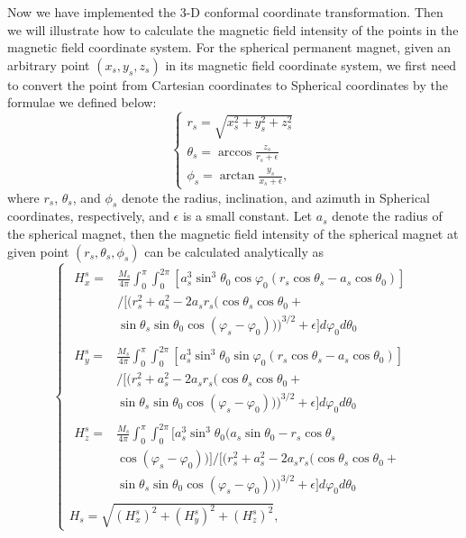 \documentclass[journal]{IEEEtran}
\begin{document}
Now we have implemented the 3-D conformal coordinate transformation. Then we will illustrate how to calculate the magnetic field intensity of the points in the magnetic field coordinate system. For the spherical permanent magnet, given an arbitrary point $(x_s, y_s, z_s)$ in its magnetic field coordinate system, we first need to convert the point from Cartesian coordinates to Spherical coordinates by the formulae we defined below:
\begin{equation}
    \left\{\begin{array}{lr}
    r_s = \sqrt{x_s^2 + y_s^2 + z_s^2} \\
    \theta_s = \arccos \frac{z_s}{r_s + \epsilon} \\
    \phi_s = \arctan \frac{y_s}{x_s + \epsilon},
    \end{array}\right.
\end{equation}
where $r_s$, $\theta_s$, and $\phi_s$ denote the radius, inclination, and azimuth in Spherical coordinates, respectively, and $\epsilon$ is a small constant. 
Let $a_s$ denote the radius of the spherical magnet, then the magnetic field intensity of the spherical magnet at given point $(r_s, \theta_s, \phi_s)$ can be calculated analytically as
\begin{equation}
    \left\{\begin{array}{lr}
    \begin{aligned}
    H_{x}^{s} = &\frac{M_s}{4\pi} \int_{0}^{\pi} \int_{0}^{2\pi}
    [a_s^3\sin^3\theta_0\cos\varphi_0(r_s\cos\theta_s - a_s\cos\theta_0)] \\ 
    &/ [(r_s^2 + a_s^2 - 2a_s r_s(\cos\theta_s\cos\theta_0 + \\ &\sin\theta_s\sin\theta_0\cos(\varphi_s - \varphi_0)))^{3/2} + \epsilon] d\varphi_0 d\theta_0
    \end{aligned}
    \\
    \begin{aligned}
    H_{y}^{s} = &\frac{M_s}{4\pi} \int_{0}^{\pi} \int_{0}^{2\pi}
    [a_s^3\sin^3\theta_0\sin\varphi_0(r_s\cos\theta_s - a_s\cos\theta_0)] \\ 
    &/ [(r_s^2 + a_s^2 - 2a_s r_s(\cos\theta_s\cos\theta_0 + \\ &\sin\theta_s\sin\theta_0\cos(\varphi_s - \varphi_0)))^{3/2} + \epsilon] d\varphi_0 d\theta_0
    \end{aligned}
    \\
    \begin{aligned}
    H_{z}^{s} = &\frac{M_s}{4\pi} \int_{0}^{\pi} \int_{0}^{2\pi}
    [a_s^3\sin^3\theta_0(a_s\sin\theta_0 - r_s\cos\theta_s \\ 
    &\cos(\varphi_s - \varphi_0))] / [(r_s^2 + a_s^2 - 2a_s r_s(\cos\theta_s\cos\theta_0 + \\ &\sin\theta_s\sin\theta_0\cos(\varphi_s - \varphi_0)))^{3/2} + \epsilon] d\varphi_0 d\theta_0
    \end{aligned}
    \\
    H_{s} = \sqrt{(H_{x}^{s})^2 + (H_{y}^{s})^2 + (H_{z}^{s})^2},
    \end{array}\right.
\label{mag-sphere}
\end{equation}
\end{document}
